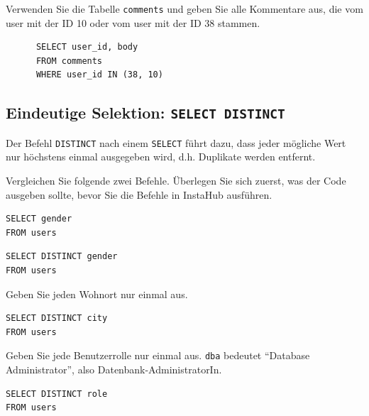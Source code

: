 \begin{myexercise}
  Verwenden Sie die Tabelle \texttt{comments} und geben Sie alle Kommentare aus, die vom user mit der ID 10 oder vom user mit der ID 38 stammen.
  \begin{myanswer}
    \begin{lstlisting}
      SELECT user_id, body 
      FROM comments 
      WHERE user_id IN (38, 10)
\end{lstlisting}
  \end{myanswer}
\end{myexercise}


\subsection{Eindeutige Selektion: \texorpdfstring{\lstinline|SELECT DISTINCT|}{SELECT DISTINCT}}

Der Befehl \lstinline|DISTINCT| nach einem \lstinline|SELECT| führt dazu, dass jeder mögliche Wert
nur höchstens einmal ausgegeben wird, d.h. Duplikate werden entfernt.

\begin{myexercise}
  Vergleichen Sie folgende zwei Befehle. Überlegen Sie sich zuerst, was der Code ausgeben sollte, bevor Sie die Befehle in InstaHub ausführen.

 \begin{lstlisting}
SELECT gender
FROM users
\end{lstlisting}

  \begin{lstlisting}
SELECT DISTINCT gender
FROM users
\end{lstlisting}
\end{myexercise}

\begin{myexercise}
  Geben Sie jeden Wohnort nur einmal aus.
  \begin{myanswer}
    \begin{lstlisting}
SELECT DISTINCT city 
FROM users
\end{lstlisting}
  \end{myanswer}
\end{myexercise}
\begin{myexercise}
  Geben Sie jede Benutzerrolle nur einmal aus. \texttt{dba} bedeutet \enquote{Database Administrator}, also Datenbank-AdministratorIn.
  \begin{myanswer}
    \begin{lstlisting}
SELECT DISTINCT role
FROM users
\end{lstlisting}
  \end{myanswer}
\end{myexercise}


